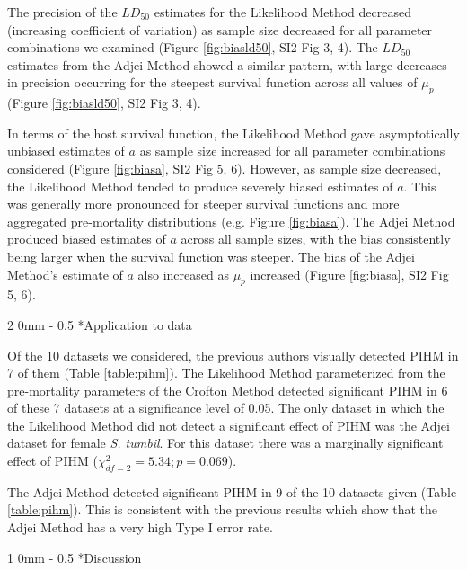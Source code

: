 \documentclass[12pt, a4paper]{article}
\makeatletter
\renewcommand{\section}{\@startsection
{section}%
{1}%
{0mm}%
{-\baselineskip}%
{0.5\baselineskip}%
{\normalfont\bf\large}} %
\renewcommand{\subsection}{\@startsection
{subsection}%
{2}%
{0mm}%
{-\baselineskip}%
{0.5\baselineskip}%
{\normalfont\bf}} %
\makeatother
\begin{document}
The precision of the $LD_{50}$ estimates for the Likelihood Method decreased
(increasing coefficient of variation) as sample size decreased for all
parameter combinations we examined (Figure \ref{fig:biasld50}, SI2 Fig 3, 4).  The $LD_{50}$ estimates from the Adjei
Method showed a similar pattern, with large decreases in precision occurring
for the steepest survival function across all values of $\mu_p$ (Figure \ref{fig:biasld50}, SI2 Fig 3, 4).

In terms of the host survival function, the Likelihood Method gave
asymptotically unbiased estimates of $a$ as sample size increased for
all parameter combinations considered (Figure \ref{fig:biasa}, SI2 Fig 5, 6).  However, as sample size decreased, the
Likelihood Method tended to produce severely biased estimates of $a$.
This was generally more pronounced for steeper survival functions and more
aggregated pre-mortality distributions (e.g. Figure \ref{fig:biasa}).  The Adjei Method produced
biased estimates of $a$ across all sample sizes, with the bias
consistently being larger when the survival function was steeper. The bias of
the Adjei Method's estimate of $a$ also increased as $\mu_p$ increased (Figure \ref{fig:biasa}, SI2 Fig 5, 6).

\subsection*{Application to data}

Of the 10 datasets we considered, the previous authors visually detected PIHM
in 7 of them (Table \ref{table:pihm}).  The Likelihood Method parameterized
from the pre-mortality parameters of the Crofton Method detected significant
PIHM in 6 of these 7 datasets at a significance level of 0.05.  The only
dataset in which the the Likelihood Method did not detect a significant effect of PIHM was the Adjei dataset
for female \emph{S. tumbil}.  For this dataset there was a marginally significant effect
of PIHM ($\chi^2_{df=2} = 5.34; p = 0.069$).

The Adjei Method detected significant PIHM in 9 of the 10 datasets given (Table \ref{table:pihm}).  This is consistent with the previous results which show that the Adjei Method has a very high Type I error rate.

\section*{Discussion}
\end{document}
